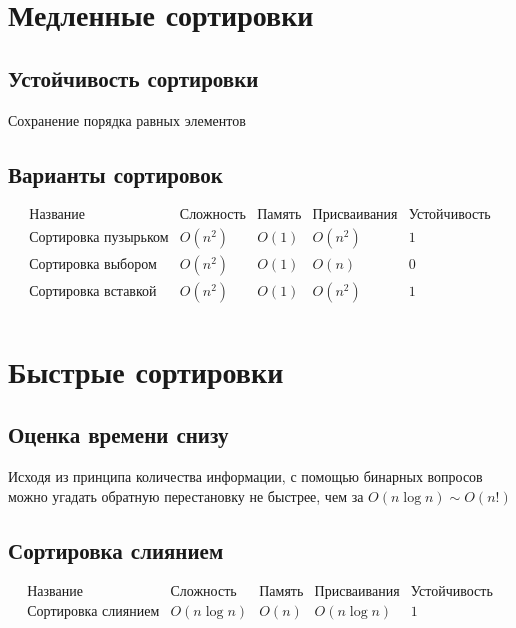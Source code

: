 \section{Медленные сортировки}

\subsection{Устойчивость сортировки}

Сохранение порядка равных элементов

\subsection{Варианты сортировок}

$$\begin{array}{c|c|c|c|c}
    \text{Название} & \text{Сложность} & \text{Память} & \text{Присваивания} & \text{Устойчивость} \\
    \hline
    \text{Сортировка пузырьком} & O(n^2) & O(1) & O(n^2) & 1 \\
    \text{Сортировка выбором} & O(n^2) & O(1) & O(n) & 0 \\
    \text{Сортировка вставкой} & O(n^2) & O(1) & O(n^2) & 1 \\
\end{array}$$


\section{Быстрые сортировки}

\subsection{Оценка времени снизу}

Исходя из принципа количества информации, с помощью бинарных вопросов можно угадать обратную перестановку не быстрее, чем за $O(n\log n) \sim O(n!)$

\subsection{Сортировка слиянием}

$$\begin{array}{c|c|c|c|c}
    \text{Название} & \text{Сложность} & \text{Память} & \text{Присваивания} & \text{Устойчивость} \\
    \hline
    \text{Сортировка слиянием} & O(n \log n) & O(n) & O(n \log n) & 1
\end{array}$$

